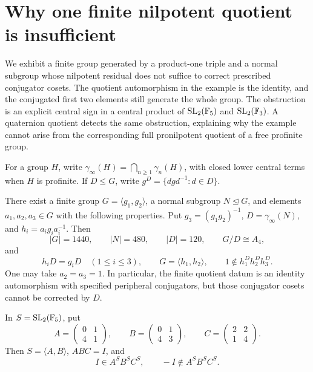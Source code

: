 \section{Why one finite nilpotent quotient is insufficient}
\label{sec:peripheral-finite-obstruction}

We exhibit a finite group generated by a product-one triple and a normal
subgroup whose nilpotent residual does not suffice to correct prescribed
conjugator cosets. The quotient automorphism in the example is the identity,
and the conjugated first two elements still generate the whole group.
The obstruction is an explicit central sign in a central product of
$\operatorname{SL}_2(\mathbb F_5)$ and $\operatorname{SL}_2(\mathbb F_3)$. A quaternion quotient detects the same
obstruction, explaining why the example cannot arise from the corresponding
full pronilpotent quotient of a free profinite group.

For a group $H$, write $\gamma_{\infty}(H)=\bigcap_{n\geq1}\gamma_n(H)$, with
closed lower central terms when $H$ is profinite. If $D\leq G$, write
$g^D=\{dgd^{-1}:d\in D\}$.

\begin{theorem}\label{thm:peripheral-finite-obstruction}
There exist a finite group $G=\langle g_1,g_2\rangle$, a normal subgroup
$N\trianglelefteq G$, and elements $a_1,a_2,a_3\in G$ with the following
properties. Put $g_3=(g_1g_2)^{-1}$, $D=\gamma_{\infty}(N)$, and
$h_i=a_ig_ia_i^{-1}$. Then
\[
|G|=1440,\qquad |N|=480,\qquad |D|=120,\qquad G/D\cong A_4,
\]
and
\[
h_iD=g_iD\quad(1\leq i\leq3),\qquad
G=\langle h_1,h_2\rangle,\qquad
1\notin h_1^D h_2^D h_3^D.
\]
One may take $a_2=a_3=1$. In particular, the finite quotient datum is an
identity automorphism with specified peripheral conjugators, but those
conjugator cosets cannot be corrected by $D$.
\end{theorem}

\begin{lemma}\label{lem:peripheral-central-sign}
In $S=\operatorname{SL}_2(\mathbb F_5)$, put
\[
A=\begin{pmatrix}0&1\\4&1\end{pmatrix},\qquad
B=\begin{pmatrix}0&1\\4&3\end{pmatrix},\qquad
C=\begin{pmatrix}2&2\\1&4\end{pmatrix}.
\]
Then $S=\langle A,B\rangle$, $ABC=I$, and
\[
I\in A^S B^S C^S,\qquad -I\notin A^S B^S C^S.
\]
\end{lemma}

